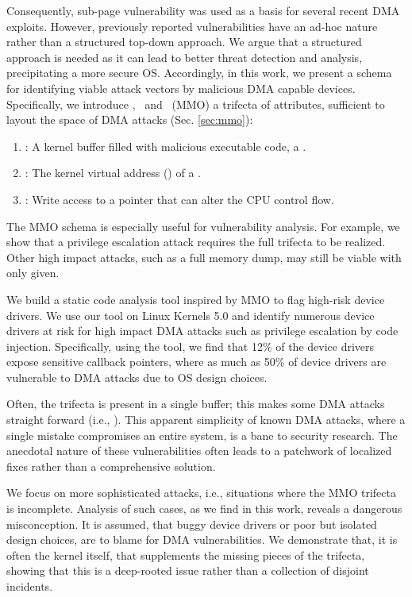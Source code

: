 Consequently, sub-page vulnerability was used as a basis for several recent DMA exploits. However, previously reported vulnerabilities have an ad-hoc nature \cite{thunder,MMT16,Ben17b} rather than a structured top-down approach. We argue that a structured approach is needed as it can lead to better threat detection and analysis, precipitating a more secure OS. Accordingly, in this work, we present a schema for identifying viable attack vectors by malicious DMA capable devices. Specifically, we introduce \means,~\motivation{} and \oportunity~(MMO) a trifecta of attributes, sufficient to layout the space of DMA attacks (Sec. \ref{sec:mmo}):
\begin{enumerate}
    \item \motivation: A kernel buffer filled with malicious executable code, a \mabaf.
    \item \means: The kernel virtual address (\kva) of a \mabaf.
    \item \oportunity: Write access to a pointer that can alter the CPU control flow.
\end{enumerate} 

The MMO schema is especially useful for vulnerability analysis. For example, we show that a privilege escalation attack requires the full trifecta to be realized. Other high impact attacks, such as a full memory dump, may still be viable with only \oportunity{} given. 

We build a static code analysis tool inspired by MMO to flag high-risk device drivers. We use our tool on Linux Kernels 5.0 and identify numerous device drivers at risk for high impact DMA attacks such as privilege escalation by code injection. Specifically, using the tool, we find that 12\% of the device drivers expose sensitive callback pointers, where as much as 50\% of device drivers are vulnerable to DMA attacks due to OS design choices.

Often, the trifecta is present in a single buffer; this makes some DMA attacks straight forward (i.e., \simple{}). This apparent simplicity of known DMA attacks, where a single mistake compromises an entire system, is a bane to security research. The anecdotal nature of these vulnerabilities often leads to a patchwork of localized fixes rather than a comprehensive solution. 

We focus on more sophisticated attacks, i.e., situations where the MMO trifecta is incomplete. Analysis of such cases, as we find in this work, reveals a dangerous misconception. It is assumed, that buggy device drivers or poor but isolated design choices, are to blame for DMA vulnerabilities. We demonstrate that, it is often the kernel itself, that supplements the missing pieces of the trifecta, showing that this is a deep-rooted issue rather than a collection of disjoint incidents.

